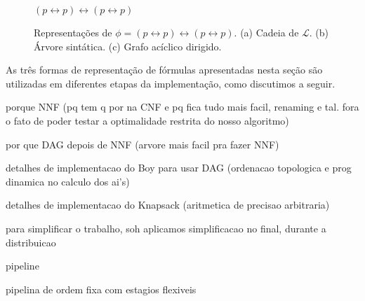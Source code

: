 \begin{figure}
	$(p \leftrightarrow p) \leftrightarrow (p \leftrightarrow p)$
	\label{figura_DAG}
	\caption{Representações de $\phi = (p \leftrightarrow p) \leftrightarrow (p \leftrightarrow p)$. (a) Cadeia de $\mathcal{L}$. (b) Árvore sintática. (c) Grafo acíclico dirigido.}
\end{figure}

As três formas de representação de fórmulas apresentadas nesta seção são utilizadas em diferentes etapas da implementação, como discutimos a seguir.

porque NNF (pq tem q por na CNF e pq fica tudo mais facil, renaming e tal. fora o fato de poder testar a optimalidade restrita do nosso algoritmo)

por que DAG depois de NNF (arvore mais facil pra fazer NNF)

detalhes de implementacao do Boy para usar DAG (ordenacao topologica e prog dinamica no calculo dos ai's)

detalhes de implementacao do Knapsack (aritmetica de precisao arbitraria)

para simplificar o trabalho, soh aplicamos simplificacao no final, durante a distribuicao

pipeline

pipelina de ordem fixa com estagios flexiveis
